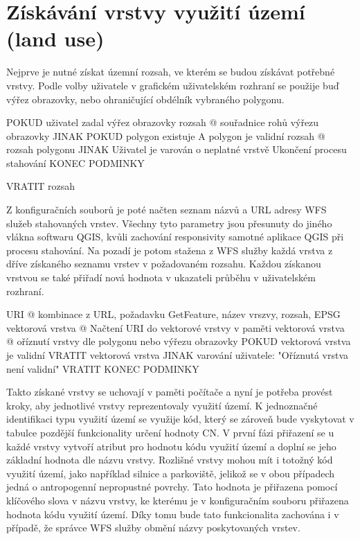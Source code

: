 \documentclass[a4paper,oneside,12pt]{book}
\begin{document}
\section{Získávání vrstvy využití území (land use)} \label{landuse}
\hspace{10mm}Nejprve je nutné získat územní rozsah, ve kterém se budou získávat potřebné vrstvy. Podle volby uživatele v grafickém uživatelském rozhraní se použije buď výřez obrazovky, nebo ohraničující obdélník vybraného polygonu. 

\begin{pseudocode}[style=mypseudocode, caption={Získání územního rozsahu}, label={kod:extent}]
POKUD uživatel zadal výřez obrazovky
    rozsah @ souřadnice rohů výřezu obrazovky
JINAK POKUD polygon existuje A polygon je validní
    rozsah @ rozsah polygonu
JINAK 
    Uživatel je varován o neplatné vrstvě
    Ukončení procesu stahování
KONEC PODMINKY

VRATIT rozsah

\end{pseudocode}

\hspace{10mm}Z konfiguračních souborů je poté načten seznam názvů a URL adresy WFS služeb stahovaných vrstev. Všechny tyto parametry jsou přesunuty do jiného vlákna softwaru QGIS, kvůli zachování responsivity samotné aplikace QGIS při procesu stahování. Na pozadí je potom stažena z WFS služby každá vrstva z dříve získaného seznamu vrstev v požadovaném rozsahu. Každou získanou vrstvou se také přiřadí nová hodnota v ukazateli průběhu v uživatelském rozhraní.

\begin{pseudocode}[style=mypseudocode, caption={Stažení vrstvy z WFS služby}, label={kod:wfs}]
URI @ kombinace z URL, požadavku GetFeature, název vrszvy, rozsah, EPSG
vektorová vrstva @ Načtení URI do vektorové vrstvy v paměti
vektorová vrstva @ oříznutí vrstvy dle polygonu nebo výřezu obrazovky
POKUD vektorová vrstva je validní
    VRATIT vektorová vrstva
JINAK
    varování uživatele: "Oříznutá vrstva není validní"
    VRATIT 
KONEC PODMINKY
\end{pseudocode}
\hspace{10mm}Takto získané vrstvy se uchovají v paměti počítače a nyní je potřeba provést kroky, aby jednotlivé vrstvy reprezentovaly využití území. K jednoznačné identifikaci typu využití území se využije kód, který se zároveň bude vyskytovat v tabulce pozdější funkcionality určení hodnoty CN. V první fázi přiřazení se u každé vrstvy vytvoří atribut pro hodnotu kódu využití území a doplní se jeho základní hodnota dle názvu vrstvy. Rozlišné vrstvy mohou mít i totožný kód využití území, jako například silnice a parkoviště, jelikož se v obou případech jedná o antropogenní nepropustné povrchy. Tato hodnota je přiřazena pomocí klíčového slova v názvu vrstvy, ke kterému je v konfiguračním souboru přiřazena hodnota kódu využití území. Díky tomu bude tato funkcionalita zachována i v případě, že správce WFS služby obmění názvy poskytovaných vrstev.
\end{document}
